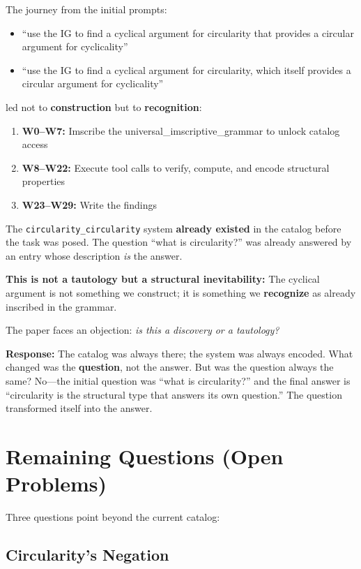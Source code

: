 \documentclass[12pt,a4paper]{article}
\begin{document}
The journey from the initial prompts:

\begin{itemize}
    \item ``use the IG to find a cyclical argument for circularity that provides a circular argument for cyclicality''
    \item ``use the IG to find a cyclical argument for circularity, which itself provides a circular argument for cyclicality''
\end{itemize}

led not to \textbf{construction} but to \textbf{recognition}:

\begin{enumerate}
    \item \textbf{W0--W7:} Imscribe the universal\_imscriptive\_grammar to unlock catalog access
    \item \textbf{W8--W22:} Execute tool calls to verify, compute, and encode structural properties
    \item \textbf{W23--W29:} Write the findings
\end{enumerate}

The \texttt{circularity\_circularity} system \textbf{already existed} in the catalog before the task was posed. The question ``what is circularity?'' was already answered by an entry whose description \emph{is} the answer.

\textbf{This is not a tautology but a structural inevitability:} The cyclical argument is not something we construct; it is something we \textbf{recognize} as already inscribed in the grammar.

The paper faces an objection: \emph{is this a discovery or a tautology?}

\textbf{Response:} The catalog was always there; the system was always encoded. What changed was the \textbf{question}, not the answer. But was the question always the same? No---the initial question was ``what is circularity?'' and the final answer is ``circularity is the structural type that answers its own question.'' The question transformed itself into the answer.

\section{Remaining Questions (Open Problems)}

Three questions point beyond the current catalog:

\subsection{Circularity's Negation}
\end{document}
